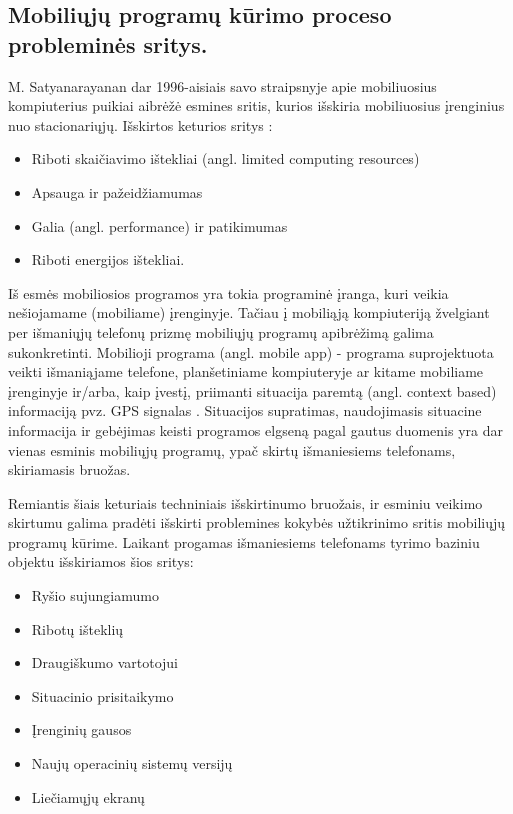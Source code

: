 \documentclass{VUMIFPSkursinis}
\begin{document}
\subsection{Mobiliųjų programų kūrimo proceso probleminės sritys.}
M. Satyanarayanan dar 1996-aisiais savo straipsnyje apie mobiliuosius kompiuterius puikiai aibrėžė esmines sritis, kurios išskiria mobiliuosius įrenginius nuo stacionariųjų. Išskirtos keturios sritys \cite{Satyanarayanan:1996:FCM:248052.248053}:
\begin{itemize}
   \item Riboti skaičiavimo ištekliai (angl. limited computing resources)
   \item Apsauga ir pažeidžiamumas
   \item Galia (angl. performance) ir patikimumas
   \item Riboti energijos ištekliai.
\end{itemize}
\bigskip
Iš esmės mobiliosios programos yra tokia programinė įranga, kuri veikia nešiojamame (mobiliame) įrenginyje. Tačiau į mobiliąją kompiuteriją žvelgiant per išmaniųjų telefonų prizmę mobiliųjų programų apibrėžimą galima sukonkretinti. Mobilioji programa (angl. mobile app) - programa suprojektuota veikti išmaniąjame telefone, planšetiniame kompiuteryje ar kitame mobiliame įrenginyje ir/arba, kaip įvestį, priimanti situacija paremtą (angl. context based) informaciją pvz. GPS signalas \cite{6496451}. Situacijos supratimas, naudojimasis situacine informacija ir gebėjimas keisti programos elgseną pagal gautus duomenis yra dar vienas esminis mobiliųjų programų, ypač skirtų išmaniesiems telefonams, skiriamasis bruožas.

Remiantis šiais keturiais techniniais išskirtinumo bruožais, ir esminiu veikimo skirtumu galima pradėti išskirti problemines kokybės užtikrinimo sritis mobiliųjų programų kūrime. Laikant progamas išmaniesiems telefonams tyrimo baziniu objektu išskiriamos šios sritys:
\begin{itemize}
  \item  Ryšio sujungiamumo
  \item Ribotų išteklių
  \item Draugiškumo vartotojui
  \item Situacinio prisitaikymo
  \item Įrenginių gausos
  \item Naujų operacinių sistemų versijų
  \item Liečiamųjų ekranų
\end{itemize}
\end{document}
